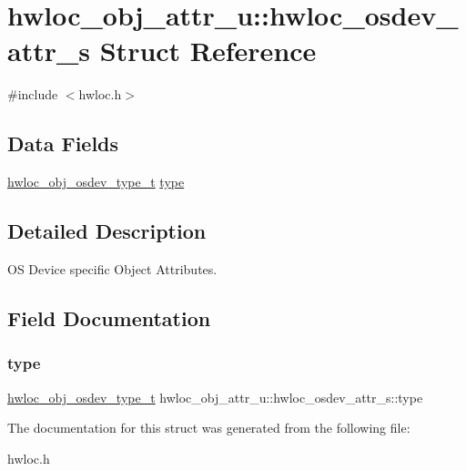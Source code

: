 \hypertarget{a00282}{}\section{hwloc\+\_\+obj\+\_\+attr\+\_\+u\+:\+:hwloc\+\_\+osdev\+\_\+attr\+\_\+s Struct Reference}
\label{a00282}


{\ttfamily \#include $<$hwloc.\+h$>$}

\subsection*{Data Fields}
\begin{DoxyCompactItemize}
\item 
\hyperlink{a00184_ga90c1e82a60ba5871d07645169e636987}{hwloc\+\_\+obj\+\_\+osdev\+\_\+type\+\_\+t} \hyperlink{a00282_a31e019e27e54ac6138d04be639bb96f9}{type}
\end{DoxyCompactItemize}


\subsection{Detailed Description}
OS Device specific Object Attributes. 

\subsection{Field Documentation}
\mbox{\label{a00282_a31e019e27e54ac6138d04be639bb96f9}} 
\subsubsection{\texorpdfstring{type}{type}}
{\footnotesize\ttfamily \hyperlink{a00184_ga90c1e82a60ba5871d07645169e636987}{hwloc\+\_\+obj\+\_\+osdev\+\_\+type\+\_\+t} hwloc\+\_\+obj\+\_\+attr\+\_\+u\+::hwloc\+\_\+osdev\+\_\+attr\+\_\+s\+::type}



The documentation for this struct was generated from the following file\+:\begin{DoxyCompactItemize}
\item 
hwloc.\+h\end{DoxyCompactItemize}
